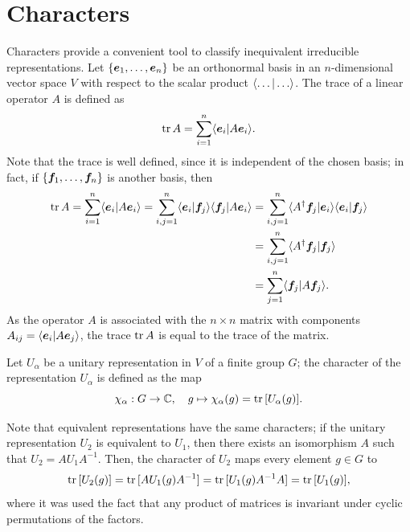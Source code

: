 \section{Characters}
Characters provide a convenient tool to classify inequivalent irreducible representations. Let $\{\bm{e}_1,\dots,\bm{e}_n\}$ be an orthonormal basis in an $n$-dimensional vector space $V$ with respect to the scalar product $\mybraket{\dots}{\dots}$. The trace of a linear operator $A$ is defined as
\begin{equation}
    \mathrm{tr}\,{A} = \sum_{i=1}^n\langle \bm{e}_i | A\bm{e}_i \rangle.
\end{equation}
Note that the trace is well defined, since it is independent of the chosen basis; in fact, if $\{\bm{f}_1,\dots,\bm{f}_n\}$ is another basis, then
\begin{equation}
    \begin{split}
        \mathrm{tr}\,{A} = \sum_{i=1}^n\langle \bm{e}_i | A\bm{e}_i \rangle = \sum_{i,j=1}^n\langle \bm{e}_i | \bm{f}_j \rangle\langle \bm{f}_j | A\bm{e}_i \rangle &= \sum_{i,j=1}^n\langle A^\dagger\bm{f}_j | \bm{e}_i \rangle\langle \bm{e}_i | \bm{f}_j \rangle \\
        &= \sum_{i,j=1}^n\langle A^\dagger\bm{f}_j | \bm{f}_j \rangle \\
        &= \sum_{j=1}^n\langle \bm{f}_j | A\bm{f}_j \rangle.
    \end{split}
\end{equation}
As the operator $A$ is associated with the $n \times n$ matrix with components $A_{ij} = \langle \bm{e}_i | A\bm{e}_j \rangle$, the trace $\mathrm{tr}\,{A}$ is equal to the trace of the matrix. 
\begin{defn}
    Let $U_\alpha$ be a unitary representation in $V$ of a finite group $G$; the character of the representation $U_\alpha$ is defined as the map
    \begin{equation}
        \chi_\alpha : G \to \mathbb{C},\quad g\mapsto\chi_\alpha(g) = \mathrm{tr}\,{[U_\alpha(g)]}.
    \end{equation}
\end{defn}
Note that equivalent representations have the same characters; if the unitary representation $U_2$ is equivalent to $U_1$, then there exists an isomorphism $A$ such that $U_2 = AU_1A^{-1}$. Then, the character of $U_2$ maps every element $g \in G$ to 
\begin{equation}
    \mathrm{tr}\,{[U_2(g)]} = \mathrm{tr}\,{[AU_1(g)A^{-1}]} = \mathrm{tr}\,{[U_1(g)A^{-1}A]} = \mathrm{tr}\,{[U_1(g)]},
\end{equation}
where it was used the fact that any product of matrices is invariant under cyclic permutations of the factors. 

